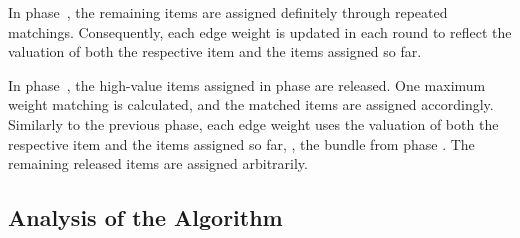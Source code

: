 In phase~\phaseii, the remaining items are assigned definitely through repeated matchings.
Consequently, each edge weight is updated in each round to reflect the valuation of both the respective item and the items assigned so far.

In phase~\phaseiii, the high-value items assigned in phase \phasei{} are released.
One maximum weight matching is calculated, and the matched items are assigned accordingly.
Similarly to the previous phase, each edge weight uses the valuation of both the respective item and the items assigned so far, \ie, the bundle from phase \phaseii.
The remaining released items are assigned arbitrarily.

\subsection{Analysis of the Algorithm}
\label{subsec:reprematch:analysis}

